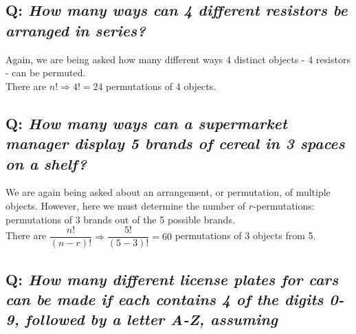 \documentclass{article}
\begin{document}
\subsection*{Q: {\em How many ways can 4 different resistors be arranged in series?}}
Again, we are being asked how many different ways 4 distinct objects - 4 resistors - can be permuted.\\[1ex]
There are $n!\Rightarrow 4!=24$ permutations of 4 objects.

\subsection*{Q: {\em How many ways can a supermarket manager display 5 brands of cereal in 3 spaces on a shelf?}}
We are again being asked about an arrangement, or permutation, of multiple objects. However, here we must determine the number of $r$-permutations: permutations of 3 brands out of the 5 possible brands.\\[1ex]
There are $\dfrac{n!}{(n-r)!}\Rightarrow\dfrac{5!}{(5-3)!}=60$ permutations of 3 objects from 5.

\subsection*{Q: {\em How many different license plates for cars can be made if each contains 4 of the digits 0-9, followed by a letter A-Z, assuming}}
\end{document}
